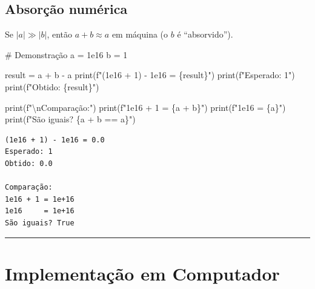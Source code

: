 \documentclass[
  11pt,
  letterpaper,
  DIV=11,
  numbers=noendperiod]{scrartcl}
\newenvironment{Shaded}{\begin{snugshade}}{\end{snugshade}}
\newcommand{\BuiltInTok}[1]{\textcolor[rgb]{0.00,0.23,0.31}{#1}}
\newcommand{\CharTok}[1]{\textcolor[rgb]{0.13,0.47,0.30}{#1}}
\newcommand{\CommentTok}[1]{\textcolor[rgb]{0.37,0.37,0.37}{#1}}
\newcommand{\DecValTok}[1]{\textcolor[rgb]{0.68,0.00,0.00}{#1}}
\newcommand{\FloatTok}[1]{\textcolor[rgb]{0.68,0.00,0.00}{#1}}
\newcommand{\NormalTok}[1]{\textcolor[rgb]{0.00,0.23,0.31}{#1}}
\newcommand{\OperatorTok}[1]{\textcolor[rgb]{0.37,0.37,0.37}{#1}}
\newcommand{\SpecialCharTok}[1]{\textcolor[rgb]{0.37,0.37,0.37}{#1}}
\newcommand{\SpecialStringTok}[1]{\textcolor[rgb]{0.13,0.47,0.30}{#1}}
\begin{document}
\subsection{Absorção numérica}\label{absoruxe7uxe3o-numuxe9rica}

Se \(|a| \gg |b|\), então \(a + b \approx a\) em máquina (o \(b\) é
``absorvido'').

\begin{Shaded}
\begin{Highlighting}[]
\CommentTok{\# Demonstração}
\NormalTok{a }\OperatorTok{=} \FloatTok{1e16}
\NormalTok{b }\OperatorTok{=} \DecValTok{1}

\NormalTok{result }\OperatorTok{=}\NormalTok{ a }\OperatorTok{+}\NormalTok{ b }\OperatorTok{{-}}\NormalTok{ a}
\BuiltInTok{print}\NormalTok{(}\SpecialStringTok{f"(1e16 + 1) {-} 1e16 = }\SpecialCharTok{\{}\NormalTok{result}\SpecialCharTok{\}}\SpecialStringTok{"}\NormalTok{)}
\BuiltInTok{print}\NormalTok{(}\SpecialStringTok{f"Esperado: 1"}\NormalTok{)}
\BuiltInTok{print}\NormalTok{(}\SpecialStringTok{f"Obtido: }\SpecialCharTok{\{}\NormalTok{result}\SpecialCharTok{\}}\SpecialStringTok{"}\NormalTok{)}

\BuiltInTok{print}\NormalTok{(}\SpecialStringTok{f"}\CharTok{\textbackslash{}n}\SpecialStringTok{Comparação:"}\NormalTok{)}
\BuiltInTok{print}\NormalTok{(}\SpecialStringTok{f"1e16 + 1 = }\SpecialCharTok{\{}\NormalTok{a }\OperatorTok{+}\NormalTok{ b}\SpecialCharTok{\}}\SpecialStringTok{"}\NormalTok{)}
\BuiltInTok{print}\NormalTok{(}\SpecialStringTok{f"1e16     = }\SpecialCharTok{\{}\NormalTok{a}\SpecialCharTok{\}}\SpecialStringTok{"}\NormalTok{)}
\BuiltInTok{print}\NormalTok{(}\SpecialStringTok{f"São iguais? }\SpecialCharTok{\{}\NormalTok{a }\OperatorTok{+}\NormalTok{ b }\OperatorTok{==}\NormalTok{ a}\SpecialCharTok{\}}\SpecialStringTok{"}\NormalTok{)}
\end{Highlighting}
\end{Shaded}

\begin{verbatim}
(1e16 + 1) - 1e16 = 0.0
Esperado: 1
Obtido: 0.0

Comparação:
1e16 + 1 = 1e+16
1e16     = 1e+16
São iguais? True
\end{verbatim}

\begin{center}\rule{0.5\linewidth}{0.5pt}\end{center}

\section{Implementação em
Computador}\label{implementauxe7uxe3o-em-computador}
\end{document}
